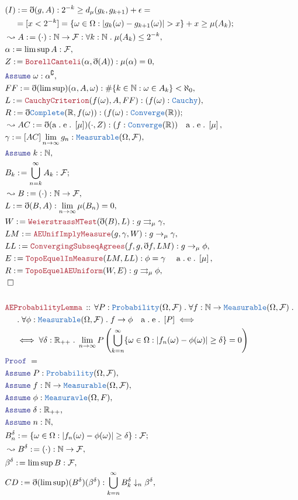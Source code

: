 \documentclass[12pt]{scrartcl}
\newcommand{\TYPE}[1]{\textcolor{NavyBlue}{\mathtt{#1}}}
\newcommand{\LOGIC}[1]{\textcolor{Blue}{\mathtt{#1}}}
\newcommand{\THM}[1]{\textcolor{Maroon}{\mathtt{#1}}}
\renewcommand{\.}{\; . \;}
\newcommand{\de}{: \kern 0.1pc =}
\newcommand{\Act}[1]{\left( #1 \right)}
\newcommand{\Theorem}[2]{& \THM{#1} \, :: \, #2 \\ & \Proof = \\ }
\newcommand{\NewLine}{\\ & \kern 1pc}
\newcommand{\ForEach}[3]{\forall #1 : #2 \. #3 }
\newcommand{\Reals}{\mathbb{R} }
\newcommand{\Nat}{\mathbb{N} }
\renewcommand{\c}{\complement}
\newcommand{\Say}[3]{& #1 \de #2 : #3, \\}
\newcommand{\Conclude}[3]{& #1 \de #2 : #3; \\}
\newcommand{\Derive}[3]{& \leadsto #1 \de #2 : #3, \\}
\newcommand{\A}{\LOGIC{Assume} \;}
\newcommand{\Assume}[2]{& \A #1 : #2, \\}
\newcommand{\QED}{\; \square}
\newcommand{\EndProof}{& \QED \\}
\newcommand{\ByDef}{\eth}
\newcommand{\Proof}{\LOGIC{Proof} \; }
\newcommand{\UC}{\rightrightarrows}
\renewcommand{\AE}[1]{\mathrm{a\. e\.} \left[#1\right]}
\newcommand{\F}{\mathcal{F}}
\renewcommand{\O}{\Omega}
\begin{document}
\begin{align*}
\Conclude{(I)}{\ByDef(g,A)}{2^{-k} \ge d_\mu(g_k,g_{k + 1 }) + \epsilon = \
 \NewLine
= [  x < 2^{-k}]=  \{ \omega \in \O : |g_k(\omega) - g_{k + 1}(\omega)| > x \} + x  
 \ge \mu(A_k)
}
\Derive{A}{(\cdot)}{\Nat \to \F : 
\ForEach{k}{\Nat}{\mu(A_k) \le 2^{-k}}
 }  
 \Say{\alpha}{\lim \sup A}{\F}
 \Say{Z}{\THM{BorellCanteli}(\alpha,\ByDef(A))}{ \mu(\alpha) = 0}
 \Assume{\omega}{\alpha^\c}
 \Say{FF}{\ByDef(\lim \sup)(\alpha,A,\omega)}{ \#\{ k \in \Nat : \omega \in A_k \} < \aleph_0}
 \Say{L}{ \THM{CauchyCriterion}(f(\omega),A,FF)}{(f(\omega) : \TYPE{Cauchy})}
 \Conclude{R}{\ByDef\TYPE{Complete}(\Reals, f(\omega) )}{(f(\omega) :  \TYPE{Converge}(\Reals))}
 \Derive{AC}{\ByDef(\AE{\mu})(\cdot,Z)} {(f : \TYPE{Converge}(\Reals)) \quad \AE{\mu}}
 \Say{\gamma}{ [AC]\lim_{n \to \infty} g_n }{\TYPE{Measurable}(\O,\F)}
 \Assume{k}{\Nat}
 \Conclude{B_k}{\bigcup_{n =k}^\infty A_k}{\F}
 \Derive{B}{(\cdot)}{\Nat  \to \F }
 \Say{L}{\ByDef(B,A)}{\lim_{n \to \infty} \mu(B_n) = 0}
 \Say{W}{\THM{WeierstrassMTest}(\ByDef(B),L)}{g \UC_\mu \gamma }
 \Say{LM}{\THM{AEUnifImplyMeasure}(g,\gamma,W)}{ g \to_\mu \gamma  }
 \Say{LL}{\THM{ConvergingSubseqAgrees}(f,g,\ByDef f,LM)}{g \to_\mu \phi}
 \Say{E}{\THM{TopoEquelInMeasure}(LM,LL)}{\phi = \gamma \quad\ 
 \AE{\mu}}
 \Say{R}{\THM{TopoEquelAEUniform}(W,E)}{g \UC_\mu \phi}
 \EndProof 
 \\ 
\Theorem{AEProbabilityLemma}{
\ForEach{ P}{\TYPE{Probability}(\O,\F)}{
\ForEach{f}{\Nat \to \TYPE{Measurable}(\O,\F)
\. \NewLine
}{  
\ForEach{\phi}{\TYPE{Measurable}(\O,\F)  }{
 f \to \phi \quad \AE{P} 
 \iff
 \NewLine 
 \iff
 \ForEach{\delta}{\Reals_{++}}{
    \lim_{n \to \infty} P \Act{
  \bigcup^\infty_{k = n} \{ \omega \in \O : |f_n(\omega) - \phi(\omega)| \ge \delta \} = 0
 }}}}}} 
 \Assume{P}{\TYPE{Probability}(\O,\F)}
 \Assume{f}{\Nat \to \TYPE{Measurable}(\O,\F)}
 \Assume{\phi}{\TYPE{Measuravle}(\O,F)}
 \Assume{\delta}{\Reals_{++}}
 \Assume{n}{\Nat}
 \Conclude{B_n^\delta}{\{ \omega \in \O  : |f_n(\omega) - \phi(\omega)| \ge \delta  \}}{\F }
 \Derive{B^\delta}{(\cdot)}{\Nat \to \F}
 \Say{\beta^\delta}{\lim\sup B}{\F}
 \Say{CD}{\ByDef(\lim \sup)(B^\delta)(\beta^\delta)}{ \bigcup_{k= n}^\infty B^\delta_k \downarrow_n \beta^\delta }
\end{align*}
\newpage
\end{document}
